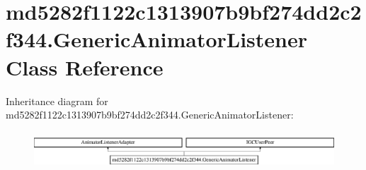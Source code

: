 \hypertarget{classmd5282f1122c1313907b9bf274dd2c2f344_1_1GenericAnimatorListener}{}\section{md5282f1122c1313907b9bf274dd2c2f344.\+Generic\+Animator\+Listener Class Reference}
\label{classmd5282f1122c1313907b9bf274dd2c2f344_1_1GenericAnimatorListener}
Inheritance diagram for md5282f1122c1313907b9bf274dd2c2f344.\+Generic\+Animator\+Listener\+:\begin{figure}[H]
\begin{center}
\leavevmode
\includegraphics[height=1.393035cm]{classmd5282f1122c1313907b9bf274dd2c2f344_1_1GenericAnimatorListener}
\end{center}
\end{figure}
